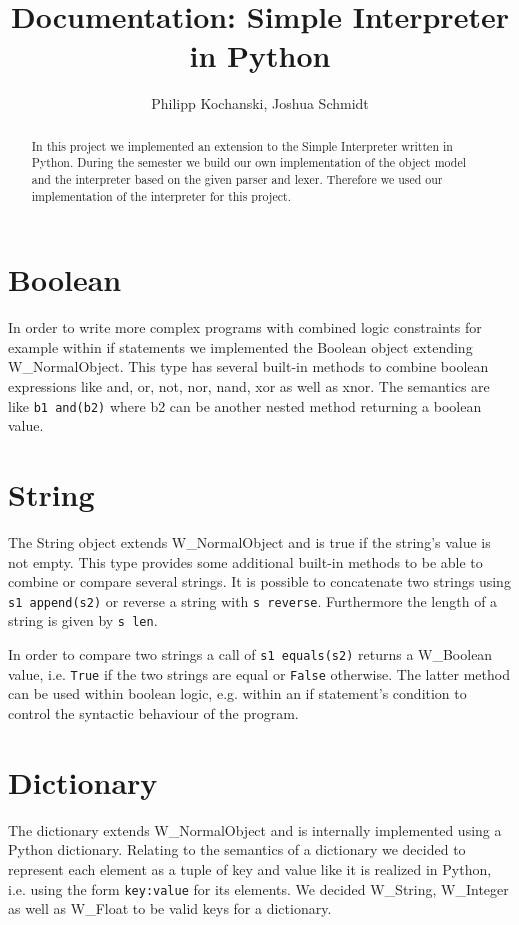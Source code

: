 \documentclass{article}
\begin{document}
\title{Documentation: Simple Interpreter in Python}
\author{Philipp Kochanski, Joshua Schmidt}

\maketitle

\begin{abstract}
In this project we implemented an extension to the Simple Interpreter written in Python. During the semester we build our own implementation of the object model and the interpreter based on the given parser and lexer. Therefore we used our implementation of the interpreter for this project.
\end{abstract}

\section{Boolean}
In order to write more complex programs with combined logic constraints for example within if statements we implemented the Boolean object extending W\_NormalObject.
This type has several built-in methods to combine boolean expressions like and, or, not, nor, nand, xor as well as xnor.
The semantics are like \texttt{b1 and(b2)} where b2 can be another nested method returning a boolean value.


\section{String}
The String object extends W\_NormalObject and is true if the string's value is not empty.
This type provides some additional built-in methods to be able to combine or compare several strings. 
It is possible to concatenate two strings using \texttt{s1 append(s2)} or reverse a string with \texttt{s reverse}. Furthermore the length of a string is given by \texttt{s len}. 

In order to compare two strings a call of \texttt{s1 equals(s2)} returns a W\_Boolean value, i.e. \texttt{True} if the two strings are equal or \texttt{False} otherwise.
The latter method can be used within boolean logic, e.g. within an if statement's condition to control the syntactic behaviour of the program.

\section{Dictionary}
\label{dicts}
The dictionary extends W\_NormalObject and is internally implemented using a Python dictionary.
Relating to the semantics of a dictionary we decided to represent each element as a tuple of key and value like it is realized in Python, i.e. using the form \texttt{key:value} for its elements.
We decided W\_String, W\_Integer as well as W\_Float to be valid keys for a dictionary.
\end{document}
